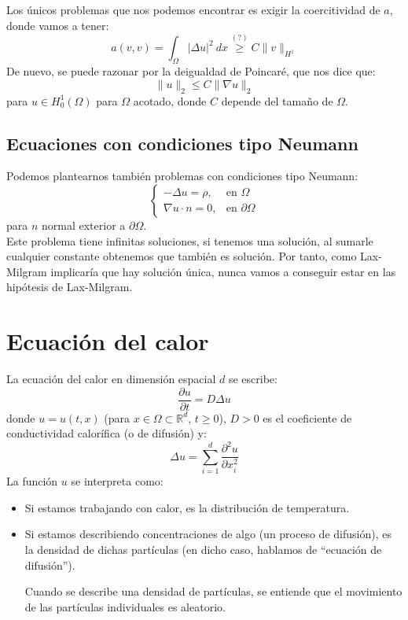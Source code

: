 \noindent
Los únicos problemas que nos podemos encontrar es exigir la coercitividad de $a$, donde vamos a tener:
\begin{equation*}
    a(v,v) = \int_\Omega |\Delta u|^2~dx \stackrel{(?)}{\geq} C\|v\|_{H^1}
\end{equation*}
De nuevo, se puede razonar por la deigualdad de Poincaré, que nos dice que:
\begin{equation*}
    \|u\|_2 \leq C\|\nabla u\|_2 
\end{equation*}
para $u\in H^1_0(\Omega)$ para $\Omega$ acotado, donde $C$ depende del tamaño de $\Omega$.

\subsection{Ecuaciones con condiciones tipo Neumann}
\noindent
Podemos plantearnos también problemas con condiciones tipo Neumann:
\begin{equation*}
    \left\{\begin{array}{ll}
            -\Delta u = \rho, & \text{en\ } \Omega \\
            \nabla u \cdot n = 0, & \text{en\ } \partial \Omega
    \end{array}\right.
\end{equation*}
para $n$ normal exterior a $\partial \Omega$.\\

\noindent
Este problema tiene infinitas soluciones, si tenemos una solución, al sumarle cualquier constante obtenemos que también es solución. Por tanto, como Lax-Milgram implicaría que hay solución única, nunca vamos a conseguir estar en las hipótesis de Lax-Milgram.

\section{Ecuación del calor}
\noindent
La ecuación del calor en dimensión espacial $d$ se escribe:
\begin{equation*}
    \frac{\partial u}{\partial t} = D \Delta u
\end{equation*}
donde $u = u(t,x)$ (para $x\in \Omega\subset\mathbb{R}^d$, $t\geq 0$), $D>0$ es el coeficiente de conductividad calorífica (o de difusión) y:
\begin{equation*}
    \Delta u = \sum_{i=1}^{d}\frac{\partial^2 u}{\partial x_i^2}
\end{equation*}
La función $u$ se interpreta como:
\begin{itemize}
    \item Si estamos trabajando con calor, es la distribución de temperatura.
    \item Si estamos describiendo concentraciones de algo (un proceso de difusión), es la densidad de dichas partículas (en dicho caso, hablamos de ``ecuación de difusión'').

        Cuando se describe una densidad de partículas, se entiende que el movimiento de las partículas individuales es aleatorio.
\end{itemize}

